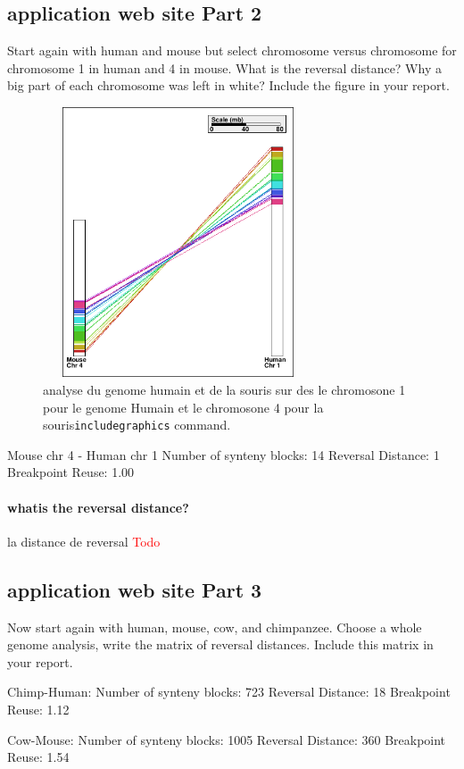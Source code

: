 \subsection{application web site Part 2}
Start again with human and mouse but select chromosome versus chromosome
for chromosome 1 in human and 4 in mouse.  What is the reversal distance?  Why a big part of each chromosome was left in white?  Include the figure in your report.
\begin{figure}[!h]
\includegraphics[width=8cm,height=8cm]{imag/graph2}
\caption{analyse du genome humain et de la souris sur des le chromosone 1 pour le genome Humain et le chromosone 4 pour la souris\texttt{includegraphics} command.}
\end{figure}

Mouse chr 4 - Human chr 1
Number of synteny blocks: 14
Reversal Distance: 1
Breakpoint Reuse: 1.00
\paragraph{whatis the reversal distance?}
la distance de reversal 
\textcolor{red}{Todo}

\subsection{application web site Part 3}
Now start again with human, mouse, cow, and chimpanzee. Choose a whole genome
analysis, write the matrix of reversal distances.  Include this matrix in your report.


Chimp-Human:
Number of synteny blocks: 723
Reversal Distance: 18
Breakpoint Reuse: 1.12

Cow-Mouse:
Number of synteny blocks: 1005
Reversal Distance: 360
Breakpoint Reuse: 1.54

